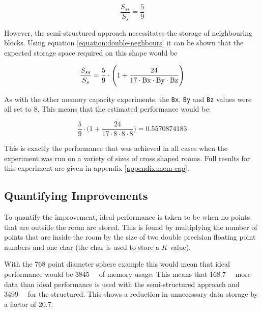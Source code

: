 \documentclass[12pt,a4paper]{report}
\begin{document}
\begin{equation}
\frac{S_{ss}}{S_{s}} = \frac{5}{9}
\end{equation}

However, the semi-structured approach necessitates the storage of neighbouring blocks. Using equation \ref{equation:double-neghbours} it can be shown that the expected storage space required on this shape would be

\begin{equation}
\frac{S_{ss}}{S_{s}} = \frac{5}{9}\cdot\Bigg(1 + \frac{24}{17\cdot\lstinline|Bx|\cdot\lstinline|By|\cdot\lstinline|Bz|}\Bigg)
\end{equation}

As with the other memory capacity experiments, the \lstinline|Bx|, \lstinline|By| and \lstinline|Bz| values were all set to \num{8}. This means that the estimated performance would be:

\begin{equation}
\frac{5}{9}\cdot\Bigg(1 + \frac{24}{17\cdot8\cdot8\cdot8}\Bigg) = 0.5570874183
\end{equation}

This is exactly the performance that was achieved in all cases when the experiment was run on a variety of sizes of cross shaped rooms. Full results for this experiment are given in appendix \ref{appendix:mem-cap}.

\subsection{Quantifying Improvements}

To quantify the improvement, ideal performance is taken to be when no points that are outside the room are stored. This is found by multiplying the number of points that are inside the room by the size of two double precision floating point numbers and one char (the char is used to store a $K$ value).

With the 768 point diameter sphere example this would mean that ideal performance would be \SI{3845}{\mebi\byte} of memory usage. This means that \SI{168.7}{\mebi\byte} more data than ideal performance is used with the semi-structured  approach and \SI{3499}{\mebi\byte} for the structured. This shows a reduction in unnecessary data storage by a factor of 20.7.
\end{document}
